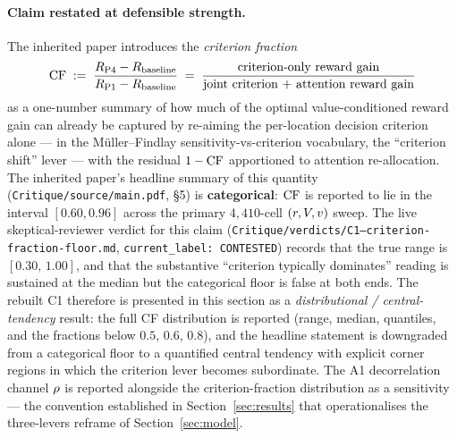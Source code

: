 \paragraph{Claim restated at defensible strength.}
The inherited paper introduces the \emph{criterion fraction}
%
\begin{equation}
  \mathrm{CF} \;:=\;
  \frac{R_{\mathrm{P4}} - R_{\text{baseline}}}{R_{\mathrm{P1}} - R_{\text{baseline}}}
  \;=\;
  \frac{\text{criterion-only reward gain}}{\text{joint criterion + attention reward gain}}
  \label{eq:cf-def}
\end{equation}
%
as a one-number summary of how much of the optimal value-conditioned
reward gain can already be captured by re-aiming the per-location
decision criterion alone --- in the Müller--Findlay
\cite{MullerFindlay1987} sensitivity-vs-criterion vocabulary, the
``criterion shift'' lever --- with the residual $1 - \mathrm{CF}$ apportioned
to attention re-allocation. The inherited paper's headline summary of
this quantity (\texttt{Critique/source/main.pdf}, §5) is
\textbf{categorical}: $\mathrm{CF}$ is reported to lie in the interval
$[0.60, 0.96]$ across the primary $4{,}410$-cell
$(r, V, v)$ sweep. The live skeptical-reviewer verdict
for this claim (\texttt{Critique/verdicts/C1--criterion-fraction-floor.md},
\texttt{current\_label: CONTESTED}) records that the true range is
$[0.30,\,1.00]$, and that the substantive ``criterion typically
dominates'' reading is sustained at the median but the categorical
floor is false at both ends. The rebuilt C1 therefore is presented in
this section as a \emph{distributional / central-tendency} result:
the full CF distribution is reported (range, median, quantiles, and
the fractions below $0.5$, $0.6$, $0.8$), and the headline statement
is downgraded from a categorical floor to a quantified central
tendency with explicit corner regions in which the criterion lever
becomes subordinate. The A1 decorrelation channel $\rho$ is
reported alongside the criterion-fraction distribution as a
sensitivity --- the convention established in
Section~\ref{sec:results} that operationalises the three-levers
reframe of Section~\ref{sec:model}.

